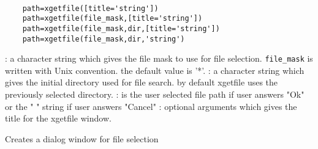 
\begin{mandesc}
  \\ %
\end{mandesc}
\label{xgetfile}
\begin{calling_sequence}
  \begin{verbatim}
    path=xgetfile([title='string'])  
    path=xgetfile(file_mask,[title='string'])  
    path=xgetfile(file_mask,dir,[title='string'])  
    path=xgetfile(file_mask,dir,'string')  
  \end{verbatim}
\end{calling_sequence}
\begin{parameters}
  \begin{varlist}
    : a character string which gives the file mask to use for file selection. \verb!file_mask! is written with Unix convention. the default value is '*'.
    : a character string which gives the initial directory used for file search. by default xgetfile uses the previously selected directory.
    : is the user selected file path if user answers "Ok" or the " " string if user answers "Cancel"
    : optional arguments which gives the title for the xgetfile window.
  \end{varlist}
\end{parameters}
\begin{mandescription}
  Creates a dialog window for file selection
\end{mandescription}
\begin{examples}
  \begin{program}
  \end{program}
\end{examples}
\begin{manseealso}
         
\end{manseealso}

